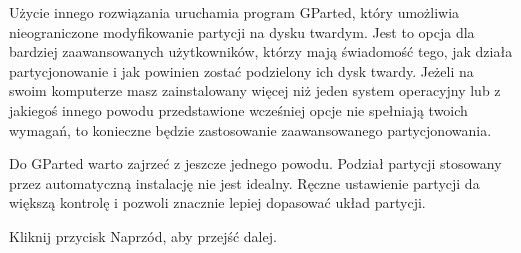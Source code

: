 \textcolor{ubuntu_orange}{Użycie innego rozwiązania} uruchamia program GParted, który umożliwia nieograniczone modyfikowanie partycji na dysku twardym. Jest to opcja dla bardziej zaawansowanych użytkowników, którzy mają świadomość tego, jak działa partycjonowanie i jak powinien zostać podzielony ich dysk twardy. Jeżeli na swoim komputerze masz zainstalowany więcej niż jeden system operacyjny lub z jakiegoś innego powodu przedstawione wcześniej opcje nie spełniają twoich wymagań, to konieczne będzie zastosowanie zaawansowanego partycjonowania.

Do GParted warto zajrzeć z jeszcze jednego powodu. Podział partycji stosowany przez automatyczną instalację nie jest idealny. Ręczne ustawienie partycji da większą kontrolę i pozwoli znacznie lepiej dopasować układ partycji.
\begin{flushright}
Kliknij przycisk \textcolor{ubuntu_orange}{Naprzód}, aby przejść dalej.
\end{flushright}
\clearpage
